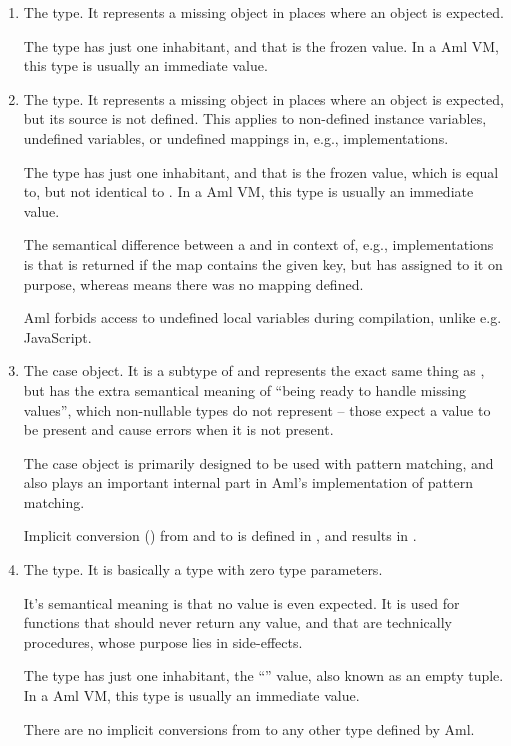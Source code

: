 \begin{enumerate}
  \item The  type. It represents a missing object in places where an object is expected. 
  
  The type has just one inhabitant, and that is the frozen  value. In a Aml VM, this type is usually an immediate value. 
  
  \item The  type. It represents a missing object in places where an object is expected, but its source is not defined. This applies to non-defined instance variables, undefined variables, or undefined mappings in, e.g.,  implementations. 
  
  The type has just one inhabitant, and that is the frozen  value, which is equal to, but not identical to . In a Aml VM, this type is usually an immediate value.
  
  The semantical difference between a  and  in context of, e.g.,  implementations is that  is returned if the map contains the given key, but has  assigned to it on purpose, whereas  means there was no mapping defined. 
  
  Aml forbids access to undefined local variables during compilation, unlike e.g. JavaScript. 
  
  \item The  case object. It is a subtype of  and represents the exact same thing as , but has the extra semantical meaning of ``being ready to handle missing values'', which non-nullable types do not represent -- those expect a value to be present and cause errors when it is not present. 
  
  The  case object is primarily designed to be used with pattern matching, and also plays an important internal part in Aml's implementation of pattern matching. 
  
  Implicit conversion () from  and  to  is defined in , and results in . 
  
  \item The  type. It is basically a  type with zero type parameters. 
  
  It's semantical meaning is that no value is even expected. It is used for functions that should never return any value, and that are technically procedures, whose purpose lies in side-effects. 
  
  The type has just one inhabitant, the ``\code{()}'' value, also known as an empty tuple. In a Aml VM, this type is usually an immediate value.
  
  There are no implicit conversions from  to any other type defined by Aml. 
\end{enumerate}

